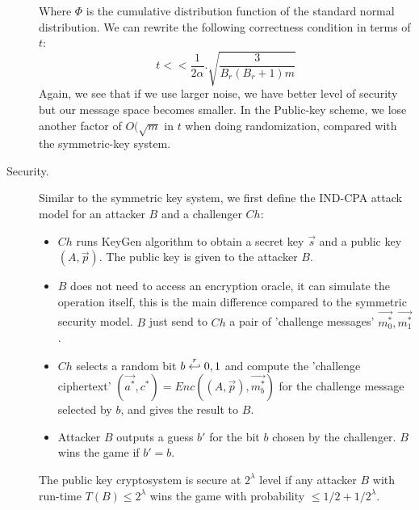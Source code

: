 \begin{description}
\[  \]
  Where $\Phi$ is the cumulative distribution function of the standard normal
  distribution. We can rewrite the following correctness condition in terms of
  $t$:
  \[
    t << \frac{1}{2\alpha}.\sqrt{\frac{3}{B_r(B_r + 1)m}}
  \]
  Again, we see that if we use larger noise, we have better level of security
  but our message space becomes smaller. In the Public-key scheme, we lose
  another factor of $O(\sqrt{m}$ in $t$ when doing randomization, compared with
  the symmetric-key system.
\item [Security.] Similar to the symmetric key system, we first define the
  IND-CPA attack model for an attacker $B$ and a challenger $Ch$:
  \begin{itemize}
  \item $Ch$ runs KeyGen algorithm to obtain a secret key $\vec{s}$ and a public
    key $(A,\vec{p})$. The public key is given to the attacker $B$.
  \item $B$ does not need to access an encryption oracle, it can simulate the
    operation itself, this is the main difference compared to the symmetric
    security model. $B$ just send to $Ch$ a pair of 'challenge messages'
    $\vec{m_0^*}, \vec{m_1^*}$.
  \item $Ch$ selects a random bit $b \stackrel{r}{\hookleftarrow} {0,1}$ and compute the
    'challenge ciphertext' $(\vec{a^*}, c^*) = Enc((A, \vec{p}), \vec{m_b^*})$
    for the challenge message selected by $b$, and gives the result to $B$.
  \item Attacker $B$ outputs a guess $b'$ for the bit $b$ chosen by the
    challenger. $B$ wins the game if $b' = b$.
  \end{itemize}
  \begin{definition}
     The public key cryptosystem is secure at
    $2^\lambda$ level if any attacker $B$ with run-time $T(B) \leq 2^\lambda$
    wins the game with probability $\leq 1/2 + 1/2^\lambda$.

    \label{def:PublicKeyIndCPARegev}
  \end{definition}


\end{description}
